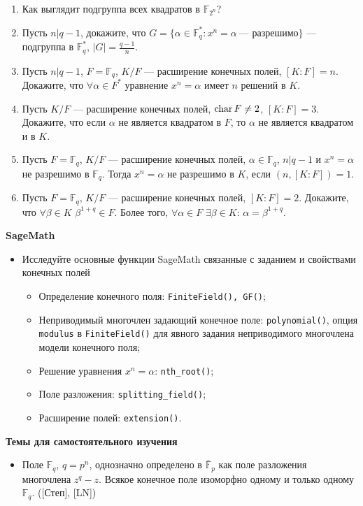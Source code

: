 \begin{enumerate}[topsep=0pt]
    \item Как выглядит подгруппа всех квадратов в $\mathbb{F}_{2^n}$? %
    \item Пусть $n|q-1$, докажите, что $G=\{\alpha\in\mathbb{F}_q^*: x^n=\alpha\ \text{--- разрешимо}\}$ --- подгруппа в $\mathbb{F}_q^*$, $|G|=\frac{q-1}{n}$. %
    \item Пусть $n|q-1$, $F=\mathbb{F}_q$, $K/F$ --- расширение конечных полей, $[K:F] = n$. Докажите, что $\forall \alpha \in F^*$ уравнение $x^n=\alpha$ имеет $n$ решений в $K$. %
    \item Пусть $K/F$ --- расширение конечных полей, $\operatorname{char} F \neq 2$, $[K:F] = 3$. Докажите, что если $\alpha$ не является квадратом в $F$, то $\alpha$ не является квадратом и в $K$. %
    \item Пусть $F=\mathbb{F}_q$, $K/F$ --- расширение конечных полей, $\alpha \in \mathbb{F}_q$, $n|q-1$ и $x^n=\alpha$ не разрешимо в $\mathbb{F}_q$. Тогда $x^n=\alpha$ не разрешимо в $K$, если $(n,[K:F])=1$. %
    \item Пусть $F=\mathbb{F}_q$, $K/F$ --- расширение конечных полей, $[K:F] = 2$. Докажите, что $\forall \beta \in K$ $\beta^{1+q} \in F$. Более того, $\forall \alpha \in F$ $\exists \beta \in K$: $\alpha=\beta^{1+q}$. %

\end{enumerate}

\noindent\textbf{SageMath}
\begin{itemize}[topsep=0pt]
    \item Исследуйте основные функции SageMath связанные с заданием и свойствами конечных полей
    \begin{itemize}[noitemsep,topsep=0pt]
        \item Определение конечного поля: \texttt{FiniteField(), GF()};
        \item Неприводимый многочлен задающий конечное поле: \texttt{polynomial()}, опция \texttt{modulus} в \texttt{FiniteField()} для явного задания неприводимого многочлена модели конечного поля;
        \item Решение уравнения $x^n=\alpha$: \texttt{nth\_root()};
        \item Поле разложения: \texttt{splitting\_field()};
        \item Расширение полей: \texttt{extension()}.
     \end{itemize}
\end{itemize}

\noindent\textbf{Темы для самостоятельного изучения}
\begin{itemize}[topsep=0pt]
    \item Поле $\mathbb{F}_q$, $q=p^n$, однозначно определено в $\bar{\mathbb{F}}_p$ как поле разложения многочлена $z^q-z$. Всякое конечное поле изоморфно одному и только одному $\mathbb{F}_q$. ([Степ], [LN])
\end{itemize}
